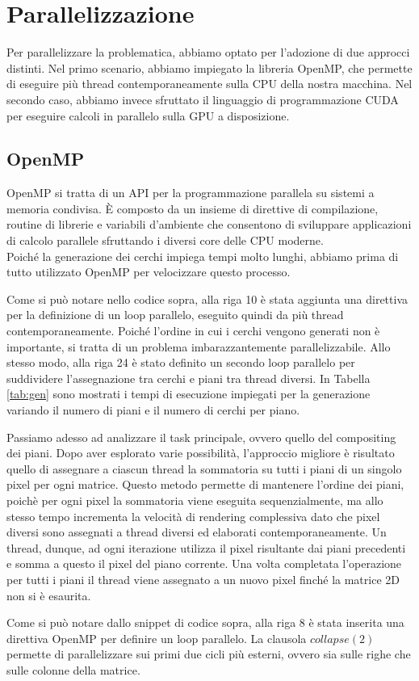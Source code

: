 \documentclass[11pt]{article}
\begin{document}
    \section{Parallelizzazione}
    Per parallelizzare la problematica, abbiamo optato per l'adozione di due approcci distinti.
    Nel primo scenario, abbiamo impiegato la libreria OpenMP, che permette di eseguire più thread contemporaneamente sulla CPU della nostra macchina.
    Nel secondo caso, abbiamo invece sfruttato il linguaggio di programmazione CUDA per eseguire calcoli in parallelo sulla GPU a disposizione.

    \subsection{OpenMP}\label{subsec:openmp}
    OpenMP si tratta di un API per la programmazione parallela su sistemi a memoria condivisa.
    È composto da un insieme di direttive di compilazione, routine di librerie e variabili d'ambiente che consentono di sviluppare applicazioni di calcolo parallele sfruttando i diversi core delle CPU moderne.\\
    Poiché la generazione dei cerchi impiega tempi molto lunghi, abbiamo prima di tutto utilizzato OpenMP per velocizzare questo processo.
    
    Come si può notare nello codice sopra, alla riga 10 è stata aggiunta una direttiva per la definizione di un loop parallelo, eseguito quindi da più thread contemporaneamente. Poiché l'ordine in cui i cerchi vengono generati non è importante, si tratta di un problema imbarazzantemente parallelizzabile.
    Allo stesso modo, alla riga 24 è stato definito un secondo loop parallelo per suddividere l'assegnazione tra cerchi e piani tra thread diversi. In Tabella \ref{tab:gen} sono mostrati i tempi di esecuzione impiegati per la generazione variando il numero di piani e il numero di cerchi per piano.

    Passiamo adesso ad analizzare il task principale, ovvero quello del compositing dei piani. Dopo aver esplorato varie possibilità, l'approccio migliore è risultato quello di assegnare a ciascun thread la sommatoria su tutti i piani di un singolo pixel per ogni matrice.
    Questo metodo permette di mantenere l'ordine dei piani, poichè per ogni pixel la sommatoria viene eseguita sequenzialmente, ma allo stesso tempo incrementa la velocità di rendering complessiva dato che pixel diversi sono assegnati a thread diversi ed elaborati contemporaneamente.
    Un thread, dunque, ad ogni iterazione utilizza il pixel risultante dai piani precedenti e somma a questo il pixel del piano corrente. Una volta completata l'operazione per tutti i piani il thread viene assegnato a un nuovo pixel finché la matrice 2D non si è esaurita.
    
    Come si può notare dallo snippet di codice sopra, alla riga 8 è stata inserita una direttiva OpenMP per definire un loop parallelo. La clausola $collapse(2)$ permette di parallelizzare sui primi due cicli più esterni, ovvero sia sulle righe che sulle colonne della matrice.\\
\end{document}
